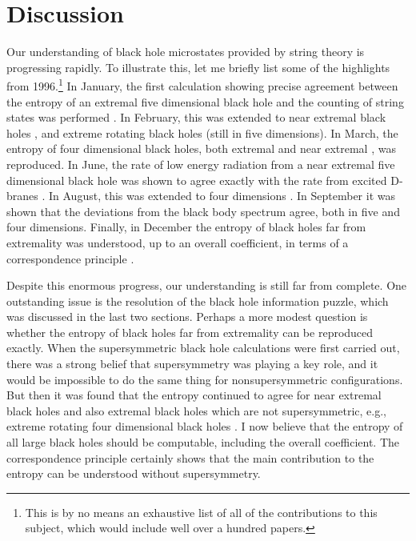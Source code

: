 \documentclass[12pt]{article}
\newcommand{\sect}[1]{\section{#1}\setcounter{equation}{0}}
\begin{document}
\sect{Discussion}

Our understanding of black hole microstates provided by string theory is
progressing rapidly. To illustrate this, let me briefly list 
some of the highlights from 1996.\footnote{This is by no means an
exhaustive list of all of the contributions to this subject, which would
include well over a hundred papers.} In January, the first
calculation showing precise agreement between the entropy of an extremal
five dimensional black hole and the counting of string states was performed
\cite{stva}.
In February, this was extended to near extremal black holes \cite{cama,host2},
and extreme
rotating black holes \cite{bmpv} (still in five dimensions). In March, the
entropy of four dimensional black holes, both extremal \cite{mast1,jkm}
and near extremal \cite{hlm},
was reproduced. In June, the rate of low energy radiation from
a near extremal five dimensional black hole was shown  to agree exactly
with the rate from excited D-branes \cite{dama}. 
In August, this was extended to four 
dimensions \cite{gukl2}.
In September it was shown that the deviations from the black body
spectrum agree, both in five \cite{mast2} and four \cite{gukl} dimensions.
Finally, in December the entropy of black holes far from
extremality was understood, up to an overall coefficient, in terms of
a correspondence principle \cite{hopo}. 

Despite this enormous progress, our understanding is still far from 
complete. One outstanding issue is the resolution of the black hole
information puzzle, which was discussed in the last two sections. 
Perhaps a more modest question is
whether the entropy of black holes
far from extremality can be reproduced exactly. When the supersymmetric 
black hole calculations were first carried out, there was a strong
belief that supersymmetry was playing a key role, and it would
be impossible to do the same thing for nonsupersymmetric configurations.
But then it was found that the entropy continued to 
agree for near extremal black holes and also extremal black
holes which are not supersymmetric, e.g., extreme
rotating four dimensional black holes \cite{hlm,dab}. I now believe that the 
entropy of all large black holes should be computable, including the
overall coefficient.
The
correspondence principle certainly
shows that the main contribution to the entropy
can be understood without supersymmetry.
\end{document}

